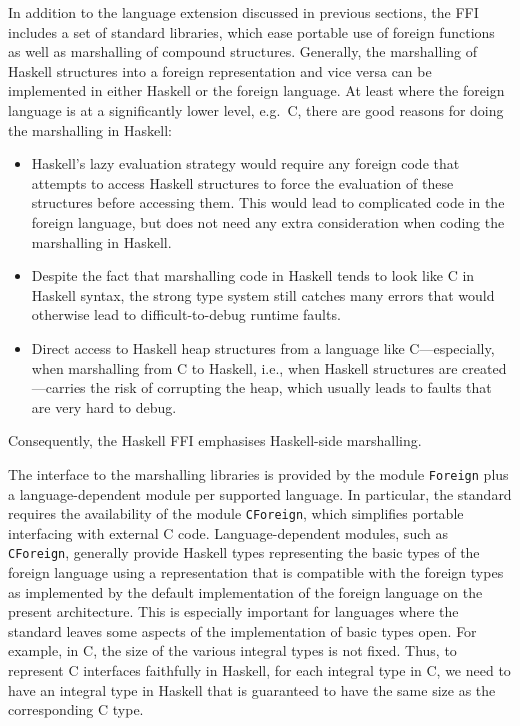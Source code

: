 \documentclass[a4paper,twoside]{article}
\newcommand{\code}[1]{\texttt{#1}}      %
\begin{document}
In addition to the language extension discussed in previous sections, the FFI
includes a set of standard libraries, which ease portable use of foreign
functions as well as marshalling of compound structures.  Generally, the
marshalling of Haskell structures into a foreign representation and vice versa
can be implemented in either Haskell or the foreign language.  At least where
the foreign language is at a significantly lower level, e.g.\ C, there are
good reasons for doing the marshalling in Haskell:
%
\begin{itemize}
\item Haskell's lazy evaluation strategy would require any foreign code that
  attempts to access Haskell structures to force the evaluation of these
  structures before accessing them. This would lead to complicated code in the
  foreign language, but does not need any extra consideration when coding the
  marshalling in Haskell.
\item Despite the fact that marshalling code in Haskell tends to look like C
  in Haskell syntax, the strong type system still catches many errors that
  would otherwise lead to difficult-to-debug runtime faults.
\item Direct access to Haskell heap structures from a language like
  C---especially, when marshalling from C to Haskell, i.e., when Haskell
  structures are created---carries the risk of corrupting the heap, which
  usually leads to faults that are very hard to debug.
\end{itemize}
%
Consequently, the Haskell FFI emphasises Haskell-side marshalling.

The interface to the marshalling libraries is provided by the module
\code{Foreign} plus a language-dependent module per supported language.  In
particular, the standard requires the availability of the module
\code{CForeign}, which simplifies portable interfacing with external C code.
Language-dependent modules, such as \code{CForeign}, generally provide Haskell
types representing the basic types of the foreign language using a
representation that is compatible with the foreign types as implemented by the
default implementation of the foreign language on the present architecture.
This is especially important for languages where the standard leaves some
aspects of the implementation of basic types open.  For example, in C, the
size of the various integral types is not fixed.  Thus, to represent C
interfaces faithfully in Haskell, for each integral type in C, we need to have
an integral type in Haskell that is guaranteed to have the same size as the
corresponding C type.
\end{document}

